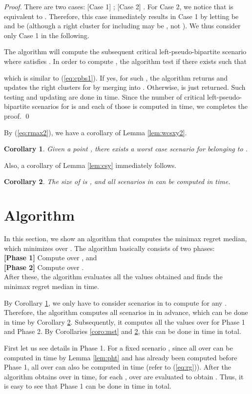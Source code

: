 \documentclass[a4paper]{llncs}
\newtheorem{coro}{Corollary}
\begin{document}
\begin{proof}
There are two cases: 
[Case 1] ; 
[Case 2] .
For Case 2,
we notice that  is equivalent to .
Therefore, this case immediately results in Case 1 by letting  be  and  be 
(although a right cluster for  including  may be , not ).
We thus consider only Case 1 in the following.

The algorithm will compute the subsequent critical left-pseudo-bipartite scenario 
where  satisfies .
In order to compute , the algorithm test if there exists  such that

which is similar to (\ref{eq:cpbs1}).
If yes, for such , the algorithm returns  and updates the right clusters for  by merging  into .
Otherwise,  is just returned. 
Such testing and updating are done in  time.
Since the number of critical left-pseudo-bipartite scenarios for  is  and each of those is computed in  time,
we completes the proof.
\qed
\end{proof}
By (\ref{eq:rmax2}), we have a corollary of Lemma \ref{lem:wcsxy2}.
\begin{coro}
Given a point , there exists a worst case scenario for  belonging to .
\label{coro:wcsx}
\end{coro}
Also, a corollary of Lemma \ref{lem:csy} immediately follows.
\begin{coro}
The size of  is ,
and all scenarios in  can be computed in  time.
\label{coro:cusy}
\end{coro}

\section{Algorithm}
\label{sec:al}
In this section, we show an algorithm that computes the minimax regret median, which minimizes  over .
The algorithm basically consists of two phases: \\
{\bf [Phase 1]} Compute  over , and \\
{\bf [Phase 2]} Compute  over . \\
After these, the algorithm evaluates all the  values obtained and finds the minimax regret median in  time.

By Corollary \ref{coro:wcsx}, we only have to consider scenarios in  to compute  for any .
Therefore, the algorithm computes all scenarios in  in advance, which can be done in  time by Corollary \ref{coro:cusy}.
Subsequently, it computes all the values  over  for Phase 1 and Phase 2.
By Corollaries \ref{coro:mst} and \ref{coro:cusy}, this can be done in  time in total.  

First let us see details in Phase 1. 
For a fixed scenario ,
since all  over  can be computed in  time by Lemma \ref{lem:pht}
and  has already been computed before Phase 1,
all  over  can also be computed in  time (refer to (\ref{eq:rg})).
After the algorithm obtains  over  in  time,
for each ,
 over  are evaluated to obtain .
Thus, it is easy to see that Phase 1 can be done in  time in total.
\end{document}
